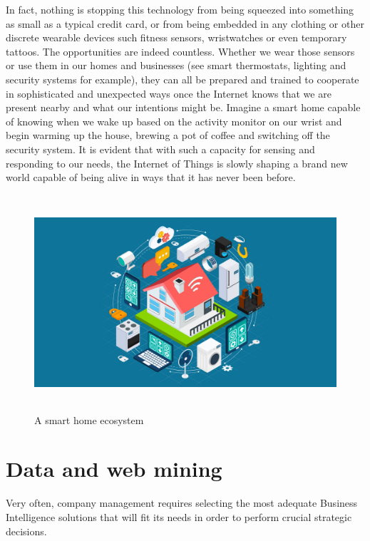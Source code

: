 In fact, nothing is stopping this technology from being squeezed into something as small as a typical credit card, or from being embedded in any clothing or other discrete wearable devices such fitness sensors, wristwatches or even temporary tattoos. The opportunities are indeed countless.
Whether we wear those sensors or use them in our homes and businesses (see smart thermostats, lighting and security systems for example), they can all be prepared and trained to cooperate in sophisticated and unexpected ways once the Internet knows that we are present nearby and what our intentions might be. Imagine a smart home capable of knowing when we wake up based on the activity monitor on our wrist and begin warming up the house, brewing a pot of coffee and switching off the security system. 
It is evident that with such a capacity for sensing and responding to our needs,  the Internet of Things is slowly shaping a brand new world capable of being alive in ways that it has never been before.


\vspace{0.5cm}
\begin{figure}[htbp]
  \centering
    \includegraphics[height=8cm]{images/iot}
  \caption{A smart home ecosystem}
  \label{fig:iot}
\end{figure}
\vspace{0.5cm}

\section{Data and web mining}
\label{section:data-web-mining}
Very often, company management requires selecting the most adequate Business Intelligence solutions that will fit its needs in order to perform crucial strategic decisions.

